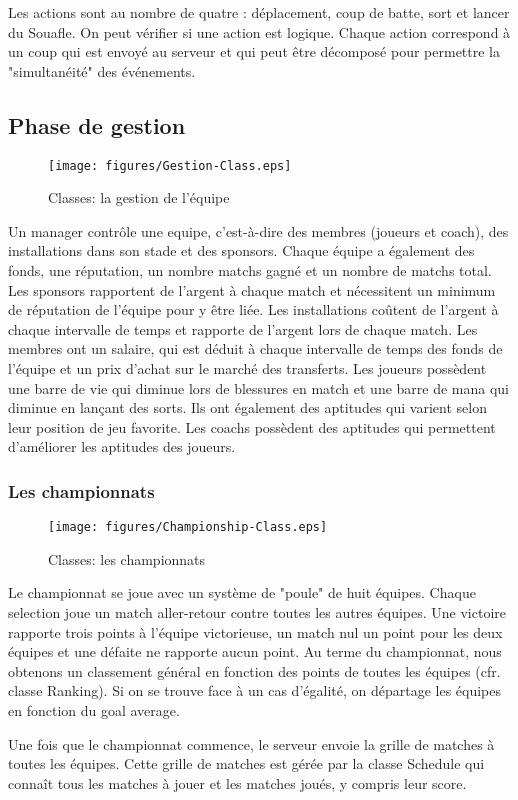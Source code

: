 Les actions sont au nombre de quatre : déplacement, coup de batte, sort et lancer 
du Souafle. On peut vérifier si une action est logique. Chaque action correspond 
à un coup qui est envoyé au \gls{serveur} et qui peut être décomposé pour permettre la 
"simultanéité" des événements.

\subsection{Phase de gestion}
\begin{sidewaysfigure}
  \centering
  \texttt{[image: figures/Gestion-Class.eps]}
  \caption{\label{fig:Class:Management} Classes: la gestion de l'équipe}
\end{sidewaysfigure}

Un \gls{manager} contrôle une \gls{equipe}, c'est-à-dire des \gls{membre}s 
(\gls{joueur}s et 
\gls{coach}), des \gls{installation}s dans son \gls{stade} et des 
\gls{sponsor}s. Chaque équipe a également des 
fonds, une réputation, un nombre matchs gagné et un nombre de matchs total.
Les sponsors rapportent de l'argent à chaque match et nécessitent un minimum 
de réputation de l'équipe pour y être liée. Les installations coûtent 
de l'argent à chaque intervalle de temps et rapporte de l'argent lors de 
chaque match.
Les membres ont un salaire, qui est déduit à chaque intervalle de temps des 
fonds de l'équipe et un prix d'achat sur le marché des transferts.
Les joueurs possèdent une barre de vie qui diminue lors de blessures en match 
et une barre de mana qui diminue en lançant des sorts. Ils ont également des 
aptitudes qui varient selon leur position de jeu favorite.
Les coachs possèdent des aptitudes qui permettent d'améliorer les aptitudes 
des joueurs.

\subsubsection{Les championnats}
\begin{figure}[h!]
  \centering
  \texttt{[image: figures/Championship-Class.eps]}
  \caption{\label{fig:Class:Championship} Classes: les championnats}
\end{figure}
Le championnat se joue avec un système de "poule" de huit équipes. Chaque 
\gls{selection} joue un 
match aller-retour contre toutes les autres équipes. Une victoire rapporte 
trois 
points à l'équipe victorieuse, un match nul un point pour les deux équipes et une défaite 
ne rapporte aucun point. Au terme du championnat, nous obtenons un classement général
en fonction des points de toutes les équipes (cfr. classe Ranking). Si on se trouve face
à un cas d'égalité, on départage les équipes en fonction du goal average. 


Une fois que le championnat commence, le serveur envoie la grille de matches à toutes 
les équipes. Cette grille de matches est gérée par la classe Schedule qui connaît tous les
matches à jouer et les matches joués, y compris leur score.




